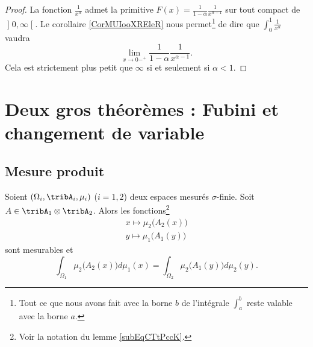 \begin{proof}
La fonction \( \frac{1}{ x^{\alpha} }\) admet la primitive \( F(x)=\frac{1}{ 1-\alpha }\frac{1}{ x^{\alpha-1} }\) sur tout compact de \( \mathopen] 0 , \infty \mathclose[\). Le corollaire \ref{CorMUIooXREleR} nous permet\footnote{Tout ce que nous avons fait avec la borne \( b\) de l'intégrale \( \int_a^b\) reste valable avec la borne \( a\).} de dire que \( \int_0^1\frac{1}{ x^{\alpha} }\) vaudra
    \begin{equation}
        \lim_{x\to 0-^+} \frac{1}{ 1-\alpha }\frac{1}{ x^{\alpha-1} }.
    \end{equation}
    Cela est strictement plus petit que \( \infty\) si et seulement si \( \alpha<1\).
\end{proof}

\section{Deux gros théorèmes : Fubini et changement de variable}

\subsection{Mesure produit}

\begin{theorem}    \label{ThoCCIsLhO}
    Soient \( (\Omega_i,\tribA_i,\mu_i)\) (\( i=1,2\)) deux espaces mesurés \( \sigma\)-finie. Soit \( A\in\tribA_1\otimes \tribA_2\). Alors les fonctions\footnote{Voir la notation du lemme \ref{subEqCTtPccK}.}
    \begin{subequations}
        \begin{align}
            x\mapsto\mu_2\big( A_2(x) \big)\\
            y\mapsto\mu_1\big( A_1(y) \big)
        \end{align}
    \end{subequations}
    sont mesurables et
    \begin{equation}    \label{EqRKXwsQJ}
        \int_{\Omega_1}\mu_2\big( A_2(x) \big)d\mu_1(x)=\int_{\Omega_2}\mu_2\big( A_1(y) \big)d\mu_2(y).
    \end{equation}
\end{theorem}

